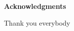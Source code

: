 \vspace*{4cm}
\Huge
\textbf{Acknowledgments} \label{sec:acknowledgments}
\normalsize

\vspace{1cm}

Thank you everybody
\vspace*{\fill}
